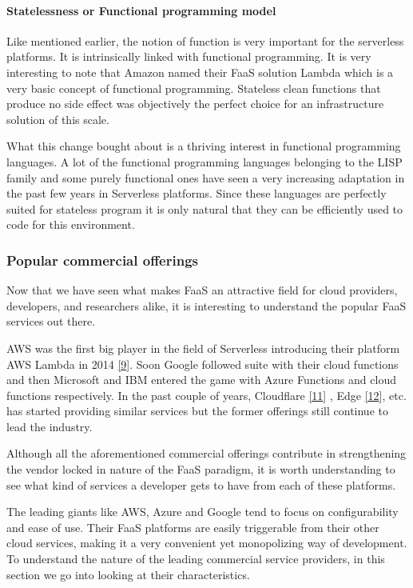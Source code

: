\documentclass[12pt,titlepage]{article}
\begin{document}
\paragraph{Statelessness or Functional programming model}
\label{sec:org1a8b7d8}
Like mentioned earlier, the notion of function is very important for the
serverless platforms. It is intrinsically linked with functional programming. It
is very interesting to note that Amazon named their FaaS solution Lambda which
is a very basic concept of functional programming. Stateless clean functions
that produce no side effect was objectively the perfect choice for an
infrastructure solution of this scale.

What this change bought about is a thriving interest in functional programming
languages. A lot of the functional programming languages belonging to the LISP
family and some purely functional ones have seen a very increasing adaptation in
the past few years in Serverless platforms. Since these languages are perfectly
suited for stateless program it is only natural that they can be efficiently
used to code for this environment.
\subsubsection{Popular commercial offerings}
\label{sec:org980aa94}
Now that we have seen what makes FaaS an attractive field for cloud providers,
developers, and researchers alike, it is interesting to understand the popular
FaaS services out there.

AWS was the first big player in the field of Serverless introducing their
platform AWS Lambda in 2014 \hyperref[ref:9]{[9}]. Soon Google followed suite with their
cloud functions and then Microsoft and IBM entered the game with Azure Functions
and cloud functions respectively. In the past couple of years, Cloudflare \hyperref[ref:11]{[11}]
, Edge \hyperref[ref:12]{[12}], etc. has started providing similar services but the former
offerings still continue to lead the industry.

Although all the aforementioned commercial offerings contribute in strengthening
the vendor locked in nature of the FaaS paradigm, it is worth understanding to
see what kind of services a developer gets to have from each of these platforms.

The leading giants like AWS, Azure and Google tend to focus on configurability
and ease of use. Their FaaS platforms are easily triggerable from their other
cloud services, making it a very convenient yet monopolizing way of development.
To understand the nature of the leading commercial service providers, in this
section we go into looking at their characteristics.
\end{document}
